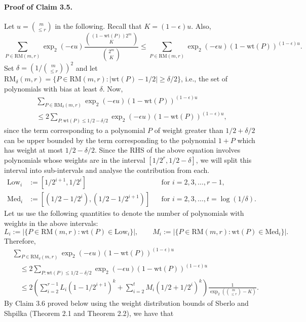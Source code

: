 \documentclass[10pt,a4paper]{article}
\begin{document}
\paragraph{Proof of Claim 3.5.} Let $u=\binom m{\le r}$ in the following. Recall that $K=(1-\epsilon)u$. Also,
\[\sum_{P\in\mathrm{RM}(m,r)}\operatorname{exp}_2(-\epsilon u)\frac{\binom{(1-\mathrm{wt}(P))2^m}K}{\binom{2^m}K}\le\sum_{P\in\mathrm{RM}(m,r)}\operatorname{exp}_2(-\epsilon u)(1-\mathrm{wt}(P))^{(1-\epsilon)u}.\]
Set $\delta=\left(1/\binom m{\le r}\right)^2$ and let $\mathrm{RM}_\delta(m,r)=\{P\in\mathrm{RM}(m,r):|\mathrm{wt}(P)-1/2|\ge\delta/2\}$, i.e., the set of polynomials with bias at least $\delta$. Now,
\begin{multline*}\sum_{P\in\mathrm{RM}_\delta(m,r)}\operatorname{exp}_2(-\epsilon u)(1-\mathrm{wt}(P))^{(1-\epsilon)u}\\\le2\sum_{P:\mathrm{wt}(P)\le1/2-\delta/2}\operatorname{exp}_2(-\epsilon u)(1-\mathrm{wt}(P))^{(1-\epsilon)u},\end{multline*}
since the term corresponding to a polynomial $P$ of weight greater than $1/2+\delta/2$ can be upper bounded by the term corresponding to the polynomial $1+P$ which has weight at most $1/2-\delta/2$.
Since the RHS of the above equation involves polynomials whose weights are in the interval $[1/2^r,1/2-\delta]$, we will split this interval into sub-intervals and analyse the contribution from each.
\begin{align*}\mathrm{Low}_i&:=[1/2^{i+1},1/2^i]&&\text{for }i=2,3,\ldots,r-1,\\\mathrm{Med}_i&:=[(1/2-1/2^i),(1/2-1/2^{i+1})]&&\text{for }i=2,3,\ldots,t=\log(1/\delta).\end{align*}
Let us use the following quantities to denote the number of polynomials with weights in the above intervals:
\[L_i:=|\{P\in\mathrm{RM}(m,r):\mathrm{wt}(P)\in\mathrm{Low}_i\}|,\qquad M_i:=|\{P\in\mathrm{RM}(m,r):\mathrm{wt}(P)\in\mathrm{Med}_i\}|.\]
Therefore,
\begin{align*}&\sum_{P\in\mathrm{RM}_\delta(m,r)}\operatorname{exp}_2(-\epsilon u)(1-\mathrm{wt}(P))^{(1-\epsilon)u}\\&\quad\le2\sum_{P:\mathrm{wt}(P)\le1/2-\delta/2}\operatorname{exp}_2(-\epsilon u)(1-\mathrm{wt}(P))^{(1-\epsilon)u}\\&\quad\le2\left(\sum_{i=2}^{r-1}L_i(1-1/2^{i+1})^k+\sum_{i=2}^tM_i(1/2+1/2^i)^k\right)\frac1{\operatorname{exp}_2\left(\binom m{\le r}-K\right)}.\end{align*}
By Claim 3.6 proved below using the weight distribution bounds of Sberlo and Shpilka (Theorem 2.1 and Theorem 2.2), we have that
\end{document}
